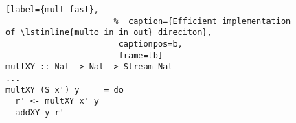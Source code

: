 \begin{figure}[!t]
  \centering
  \begin{minipage}{\columnwidth}
    \begin{lstlisting}[label={mult_fast},
                      %  caption={Efficient implementation of \lstinline{multo in in out} direciton},
                       captionpos=b,
                       frame=tb]
multXY :: Nat -> Nat -> Stream Nat
...
multXY (S x') y     = do
  r' <- multXY x' y
  addXY y r'
    \end{lstlisting}
  \end{minipage}
\end{figure}
